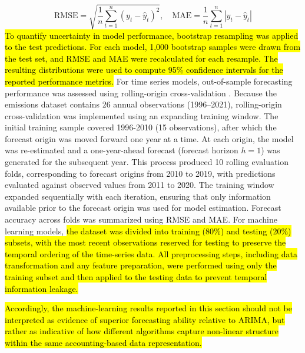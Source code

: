 \documentclass[10pt,letterpaper]{article}
\begin{document}
\begin{equation}
	\text{RMSE} = \sqrt{\frac{1}{n} \sum_{t=1}^n (y_t - \hat{y}_t)^2}, \quad \text{MAE} = \frac{1}{n} \sum_{t=1}^n |y_t - \hat{y}_t|
\end{equation}
\hl{To quantify uncertainty in model performance, bootstrap resampling was applied to the test predictions. For each model, 1,000 bootstrap samples were drawn from the test set, and RMSE and MAE were recalculated for each resample. The resulting distributions were used to compute 95\% confidence intervals for the reported performance metrics.}
For time series models, out-of-sample forecasting performance was assessed using rolling-origin cross-validation \cite{sarris2020exploiting}. Because the emissions dataset contains 26 annual observations (1996--2021), rolling-origin cross-validation was implemented using an expanding training window. The initial training sample covered 1996-2010 (15 observations), after which the forecast origin was moved forward one year at a time. At each origin, the model was re-estimated and a one-year-ahead forecast (forecast horizon $h=1$) was generated for the subsequent year. This process produced 10 rolling evaluation folds, corresponding to forecast origins from 2010 to 2019, with predictions evaluated against observed values from 2011 to 2020. The training window expanded sequentially with each iteration, ensuring that only information available prior to the forecast origin was used for model estimation. Forecast accuracy across folds was summarized using RMSE and MAE. For machine learning models, \hl{the dataset was divided into training (80\%) and testing (20\%) subsets, with the most recent observations reserved for testing to preserve the temporal ordering of the time-series data. All preprocessing steps, including data transformation and any feature preparation, were performed using only the training subset and then applied to the testing data to prevent temporal information leakage. }


\hl{Accordingly, the machine-learning results reported in this section should not be interpreted as evidence of superior forecasting ability relative to ARIMA, but rather as indicative of how different algorithms capture non-linear structure within the same accounting-based data representation.}
\end{document}
